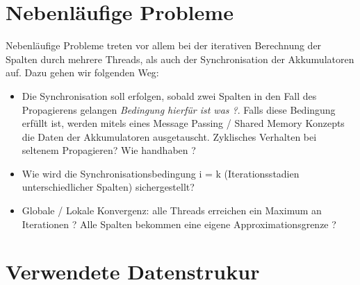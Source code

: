 \section{Nebenläufige Probleme}
Nebenläufige Probleme treten vor allem bei der iterativen Berechnung der Spalten durch mehrere Threads, als auch der Synchronisation der Akkumulatoren auf. Dazu gehen wir folgenden Weg:
\begin{itemize}
	\item Die Synchronisation soll erfolgen, sobald zwei Spalten in den Fall des Propagierens gelangen \textit{Bedingung hierfür ist was ?}. Falls diese Bedingung erfüllt ist, werden mitels eines Message Passing  / Shared Memory Konzepts die Daten der Akkumulatoren ausgetauscht. Zyklisches Verhalten bei seltenem Propagieren? Wie handhaben ?
	\item Wie wird die Synchronisationsbedingung i = k (Iterationsstadien unterschiedlicher Spalten) sichergestellt?
	\item Globale / Lokale Konvergenz: alle Threads erreichen ein Maximum an Iterationen ? Alle Spalten bekommen eine eigene Approximationsgrenze ? 
\end{itemize}

\section{Verwendete Datenstrukur}


